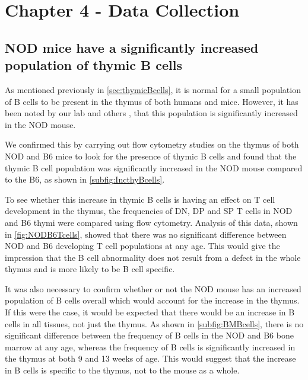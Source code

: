 
\chapter{Chapter 4 - Data Collection}




\section{NOD mice have a significantly increased population of thymic B cells}

As mentioned previously in \cref{sec:thymicBcells}, it is normal for a small population of B cells to be present in the thymus of both humans and mice.
However, it has been noted by our lab and others , that this population is significantly increased in the NOD mouse.

We confirmed this by carrying out flow cytometry studies on the thymus of both NOD and B6 mice to look for the presence of thymic B cells and found that the thymic B cell population was significantly increased in the NOD mouse compared to the B6, as shown in \cref{subfig:IncthyBcells}.

To see whether this increase in thymic B cells is having an effect on T cell development in the thymus, the frequencies of DN, DP and SP T cells in NOD and B6 thymi were compared using flow cytometry.
Analysis of this data, shown in \cref{fig:NODB6Tcells}, showed that there was no significant difference between NOD and B6 developing T cell populations at any age.
This would give the impression that the B cell abnormality does not result from a defect in the whole thymus and is more likely to be B cell specific.

It was also necessary to confirm whether or not the NOD mouse has an increased population of B cells overall which would account for the increase in the thymus.
If this were the case, it would be expected that there would be an increase in B cells in all tissues, not just the thymus.
As shown in \cref{subfig:BMBcells}, there is no significant difference between the frequency of B cells in the NOD and B6 bone marrow at any age, whereas the frequency of B cells is significantly increased in the thymus at both 9 and 13 weeks of age.
This would suggest that the increase in B cells is specific to the thymus, not to the mouse as a whole.

